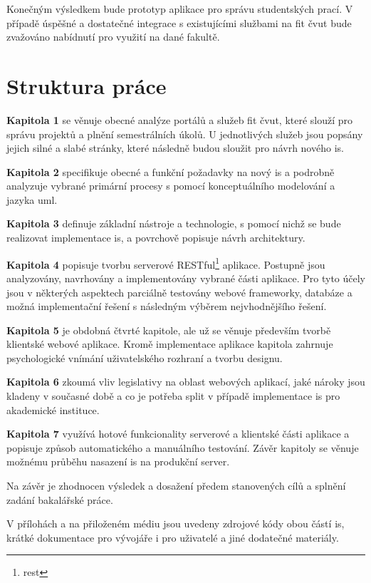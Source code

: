 Konečným výsledkem bude prototyp aplikace pro správu studentských prací. V případě úspěšné a dostatečné integrace s existujícími službami na \gls{fit} \gls{čvut} bude zvažováno nabídnutí pro využití na dané fakultě.



\clearpage
\section{Struktura práce}

\textbf{Kapitola 1} se věnuje obecné analýze portálů a služeb \gls{fit} \gls{čvut}, které slouží pro správu projektů a plnění semestrálních úkolů. U jednotlivých služeb jsou popsány jejich silné a slabé stránky, které následně budou sloužit pro návrh nového \gls{is}.

\textbf{Kapitola 2} specifikuje obecné a funkční požadavky na nový \gls{is} a podrobně analyzuje vybrané primární procesy s pomocí konceptuálního modelování a jazyka \gls{uml}.

\textbf{Kapitola 3} definuje základní nástroje a technologie, s pomocí nichž se bude realizovat implementace \gls{is}, a povrchově popisuje návrh architektury.

\textbf{Kapitola 4} popisuje tvorbu serverové RESTful\footnote{\gls{rest}} aplikace. Postupně jsou analyzovány, navrhovány a implementovány vybrané části aplikace. Pro tyto účely jsou v některých aspektech parciálně testovány webové frameworky, databáze a možná implementační řešení s následným výběrem nejvhodnějšího řešení.

\textbf{Kapitola 5} je obdobná čtvrté kapitole, ale už se věnuje především tvorbě klientské webové aplikace. Kromě implementace aplikace kapitola zahrnuje psychologické vnímání uživatelského rozhraní a tvorbu designu.

\textbf{Kapitola 6} zkoumá vliv legislativy na oblast webových aplikací, jaké nároky jsou kladeny v současné době a co je potřeba split v případě implementace \gls{is} pro akademické instituce.

\textbf{Kapitola 7} využívá hotové funkcionality serverové a klientské části aplikace a popisuje způsob automatického a manuálního testování. Závěr kapitoly se věnuje možnému průběhu nasazení \gls{is} na produkční server.

Na závěr je zhodnocen výsledek a dosažení předem stanovených cílů a splnění zadání bakalářské práce.

V přílohách a na přiloženém médiu jsou uvedeny zdrojové kódy obou částí \gls{is}, krátké dokumentace pro vývojáře i pro uživatelé a jiné dodatečné materiály.